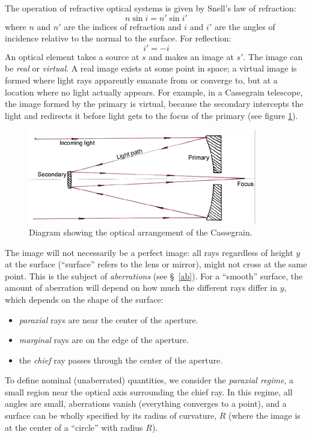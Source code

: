 \documentclass[12pt]{article}
\begin{document}
The operation of refractive optical systems is given by Snell's law
of refraction:
    $$ n\sin{i} = n'\sin{i'} $$
where $n$ and $n'$ are the indices of refraction and $i$ and $i'$ are the
angles of incidence relative to the normal to the surface. For
reflection:
    $$ i' = -i $$
An optical element takes a source at $s$ and makes an image at $s'$.
The image can be \emph{real} or \emph{virtual}.
A real image exists at some point in
space; a virtual image is formed where light rays apparently emanate
from or converge to, but at a location where no light actually
appears. For example, in a Cassegrain telescope, the image formed by
the primary is virtual, because the secondary intercepts the light and
redirects it before light gets to the focus of the primary
(see figure {\ref{cassegrain}}).
\begin{figure}[h]
    \centering
    \includegraphics{cassegrain.png}
    \caption{Diagram showing the optical arrangement of the Cassegrain.}
    \label{cassegrain}
\end{figure}
The image will not necessarily be a perfect image: all rays regardless
of height $y$ at the surface (``surface'' refers to the lens or mirror),
might not cross at the same point. This
is the subject of \emph{aberrations} (see \S{}~{\ref{ab}}).
For a ``smooth'' surface, the amount of aberration will depend on how much
the different rays differ in $y$, which depends on the shape of the
surface:
\begin{itemize}
    \item \emph{paraxial} rays are near the center of the aperture.
    \item \emph{marginal} rays are on the edge of the aperture.
    \item the \emph{chief} ray passes through the center of the aperture.
\end{itemize}
To define nominal (unaberrated) quantities, we consider the
\emph{paraxial regime}, a small region near the optical axis surrounding the
chief ray. In this regime, all angles are small, aberrations vanish
(everything converges to a point),
and a surface can be wholly specified by its radius of curvature, $R$
(where the image is at the center of a ``circle'' with radius $R$).
\end{document}
